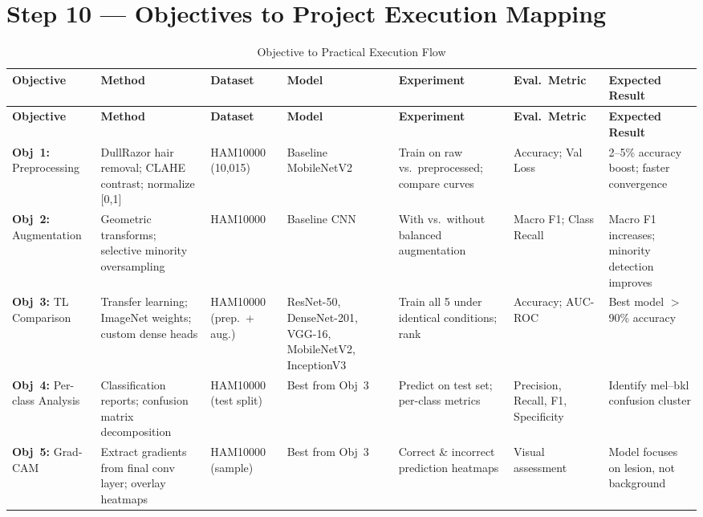 \documentclass[11pt,a4paper]{article}
\begin{document}
\begin{landscape}
{\begin{longtable}{L{3.2cm} L{3.5cm} L{3.5cm} C{1.8cm} L{3cm} L{3.5cm}}
\end{longtable}
}

\end{landscape}

\newpage

\section{Step 10 --- Objectives to Project Execution Mapping}
\label{sec:step10}

\begin{landscape}

{\small
\begin{longtable}{L{2.2cm} L{2.8cm} C{1.5cm} L{2.8cm} L{2.8cm} L{2.5cm} L{3cm}}
\caption{Objective to Practical Execution Flow}\label{tab:projmap}\\
\toprule
\textbf{Objective} & \textbf{Method} & \textbf{Dataset} & \textbf{Model} & \textbf{Experiment} & \textbf{Eval.\ Metric} & \textbf{Expected Result} \\
\midrule
\endfirsthead
\toprule
\textbf{Objective} & \textbf{Method} & \textbf{Dataset} & \textbf{Model} & \textbf{Experiment} & \textbf{Eval.\ Metric} & \textbf{Expected Result} \\
\midrule
\endhead
\bottomrule
\endlastfoot

\textbf{Obj~1:} Preprocessing & DullRazor hair removal; CLAHE contrast; normalize [0,1] & HAM10000 (10,015) & Baseline MobileNetV2 & Train on raw vs.\ preprocessed; compare curves & Accuracy; Val Loss & 2--5\% accuracy boost; faster convergence \\
\midrule
\textbf{Obj~2:} Augmentation & Geometric transforms; selective minority oversampling & HAM10000 & Baseline CNN & With vs.\ without balanced augmentation & Macro F1; Class Recall & Macro F1 increases; minority detection improves \\
\midrule
\textbf{Obj~3:} TL Comparison & Transfer learning; ImageNet weights; custom dense heads & HAM10000 (prep.\ + aug.) & ResNet-50, DenseNet-201, VGG-16, MobileNetV2, InceptionV3 & Train all 5 under identical conditions; rank & Accuracy; AUC-ROC & Best model $>$90\% accuracy \\
\midrule
\textbf{Obj~4:} Per-class Analysis & Classification reports; confusion matrix decomposition & HAM10000 (test split) & Best from Obj~3 & Predict on test set; per-class metrics & Precision, Recall, F1, Specificity & Identify mel--bkl confusion cluster \\
\midrule
\textbf{Obj~5:} Grad-CAM & Extract gradients from final conv layer; overlay heatmaps & HAM10000 (sample) & Best from Obj~3 & Correct \& incorrect prediction heatmaps & Visual assessment & Model focuses on lesion, not background \\

\end{longtable}
}

\end{landscape}
\end{document}

